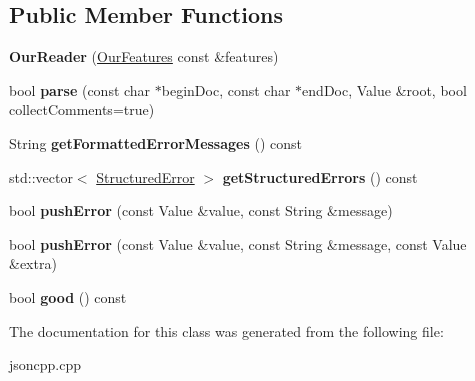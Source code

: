 \subsection*{Public Member Functions}
\begin{DoxyCompactItemize}
\item 
\mbox{\label{classJson_1_1OurReader_a48a850914b9c8d7781be172930c478e5}} 
{\bfseries Our\+Reader} (\hyperlink{classJson_1_1OurFeatures}{Our\+Features} const \&features)
\item 
\mbox{\label{classJson_1_1OurReader_aba4f8749aab7f02ec17f107e392caf80}} 
bool {\bfseries parse} (const char $\ast$begin\+Doc, const char $\ast$end\+Doc, Value \&root, bool collect\+Comments=true)
\item 
\mbox{\label{classJson_1_1OurReader_a79a84a59b0973dec644cf0d8ea32a1e6}} 
String {\bfseries get\+Formatted\+Error\+Messages} () const
\item 
\mbox{\label{classJson_1_1OurReader_a0eb2420a6bef89a3f3256191e6e3de6d}} 
std\+::vector$<$ \hyperlink{structJson_1_1OurReader_1_1StructuredError}{Structured\+Error} $>$ {\bfseries get\+Structured\+Errors} () const
\item 
\mbox{\label{classJson_1_1OurReader_a75a1c15a2e736235e2d16a39a097dd08}} 
bool {\bfseries push\+Error} (const Value \&value, const String \&message)
\item 
\mbox{\label{classJson_1_1OurReader_ae30e16fa6a620c5cc5399b1f221a1735}} 
bool {\bfseries push\+Error} (const Value \&value, const String \&message, const Value \&extra)
\item 
\mbox{\label{classJson_1_1OurReader_a63c7d874fa379397e0a5fa65f0843845}} 
bool {\bfseries good} () const
\end{DoxyCompactItemize}


The documentation for this class was generated from the following file\+:\begin{DoxyCompactItemize}
\item 
jsoncpp.\+cpp\end{DoxyCompactItemize}
